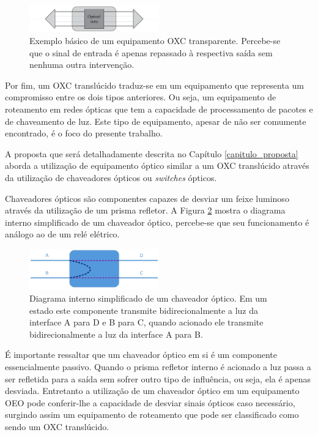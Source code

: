 \begin{figure}[!htb]
	\centering
	\includegraphics[width=0.5\textwidth]{./figuras/OXC-Optico.png} %
	\caption[Exemplo básico de OXC óptico]{Exemplo básico de um equipamento OXC transparente. Percebe-se que o sinal de entrada é apenas repassado à respectiva saída sem nenhuma outra intervenção.}
	\label{fig_oxc_optico}
\end{figure}

Por fim, um OXC translúcido traduz-se em um equipamento que representa um compromisso entre os dois tipos anteriores. Ou seja, um equipamento de roteamento em redes ópticas que tem a capacidade de processamento de pacotes e de chaveamento de luz. Este tipo de equipamento, apesar de não ser comumente encontrado, é o foco do presente trabalho.

A proposta que será detalhadamente descrita no Capítulo \ref{capitulo_proposta} aborda a utilização de equipamento óptico similar a um OXC translúcido através da utilização de chaveadores ópticos ou \emph{switches} ópticos.

Chaveadores ópticos são componentes capazes de desviar um feixe luminoso através da utilização de um prisma refletor. A Figura \ref{fig_chaveador_optico} mostra o diagrama interno simplificado de um chaveador óptico, percebe-se que seu funcionamento é análogo ao de um relé elétrico.

\begin{figure}[!htb]
	\centering
	\includegraphics[width=0.5\textwidth]{./figuras/Switch_optico.jpg} %
	\caption[Exemplo básico chaveador óptico]{Diagrama interno simplificado de um chaveador óptico. Em um estado este componente transmite bidirecionalmente a luz da interface A para D e B para C, quando acionado ele transmite bidirecionalmente a luz da interface A para B.}
	\label{fig_chaveador_optico}
\end{figure}

É importante ressaltar que um chaveador óptico em si é um componente essencialmente passivo. Quando o prisma refletor interno é acionado a luz passa a ser refletida para a saída sem sofrer outro tipo de influência, ou seja, ela é apenas desviada. Entretanto a utilização de um chaveador óptico em um equipamento OEO pode conferir-lhe a capacidade de desviar sinais ópticos caso necessário, surgindo assim um equipamento de roteamento que pode ser classificado como sendo um OXC translúcido. 

